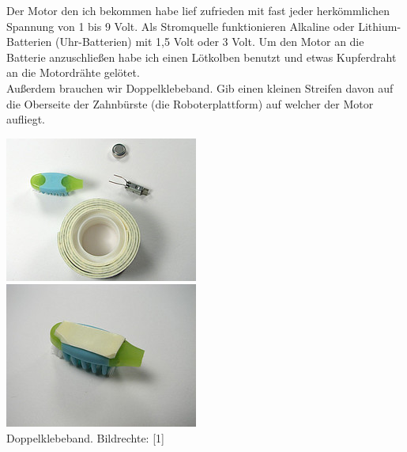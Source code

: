 \documentclass[10pt,a4paper,ngerman,twoside]{article} %
\begin{document}
\begin{multicols}{3}
Der Motor den ich bekommen habe lief zufrieden mit fast jeder herkömmlichen Spannung von 1 bis 9 Volt. Als Stromquelle funktionieren Alkaline oder Lithium-Batterien (Uhr-Batterien) mit 1,5 Volt oder 3 Volt. Um den Motor an die Batterie anzuschließen habe ich einen Lötkolben benutzt und etwas Kupferdraht an die Motordrähte gelötet.
\\ 

Außerdem brauchen wir Doppelklebeband. Gib einen kleinen Streifen davon auf die Oberseite der Zahnbürste (die Roboterplattform) auf welcher der Motor aufliegt. \\ 

\begin{center}
\includegraphics[width=\linewidth]{bristlebot/bristlebot8.jpg}\\
\includegraphics[width=\linewidth]{bristlebot/bristlebot9.jpg}\\
\footnotesize{Doppelklebeband. Bildrechte: [1]}
\end{center}


\end{multicols}
\end{document}
